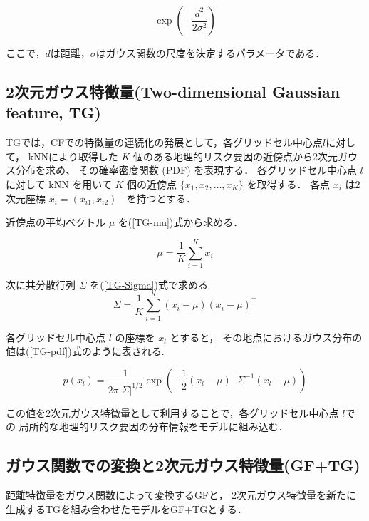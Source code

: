 \begin{equation}\label{gauss}
  \exp \left(-\frac{d^2}{2\sigma^2} \right)
\end{equation}

ここで，$d$は距離，$\sigma$はガウス関数の尺度を決定するパラメータである．

\subsection{2次元ガウス特徴量(Two-dimensional Gaussian feature, TG)}
TGでは，CFでの特徴量の連続化の発展として，各グリッドセル中心点$l$に対して，
kNNにより取得した \( K \) 個のある地理的リスク要因の近傍点から2次元ガウス分布を求め、
その確率密度関数 (PDF) を表現する．
各グリッドセル中心点 \( l \) に対して 
kNN を用いて \( K \) 個の近傍点 \( \{ x_1, x_2, \dots, x_K \} \) を取得する．
各点 \( x_i \) は2次元座標 \( x_i = (x_{i1}, x_{i2})^\top \) を持つとする．

近傍点の平均ベクトル \( \mu \) を(\ref{TG-mu})式から求める．

\begin{equation}\label{TG-mu}
  \mu = \frac{1}{K} \sum_{i=1}^{K} x_i
\end{equation}

次に共分散行列 \( \Sigma \) を(\ref{TG-Sigma})式で求める
\begin{equation}\label{TG-Sigma}
  \Sigma = \frac{1}{K} \sum_{i=1}^{K} (x_i - \mu)(x_i - \mu)^\top
\end{equation}

各グリッドセル中心点 \( l \) の座標を \( x_l \) とすると，
その地点におけるガウス分布の値は(\ref{TG-pdf})式のように表される.

\begin{equation}\label{TG-pdf}
p(x_l) = \frac{1}{2\pi |\Sigma|^{1/2}} \exp \left( -\frac{1}{2} (x_l - \mu)^\top \Sigma^{-1} (x_l - \mu) \right)
\end{equation}

この値を2次元ガウス特徴量として利用することで，各グリッドセル中心点 \( l \)での
局所的な地理的リスク要因の分布情報をモデルに組み込む．

\subsection{ガウス関数での変換と2次元ガウス特徴量(GF+TG)}
距離特徴量をガウス関数によって変換するGFと，
2次元ガウス特徴量を新たに生成するTGを組み合わせたモデルをGF+TGとする．